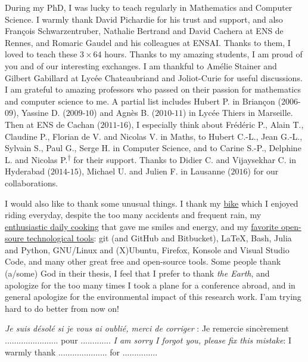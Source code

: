 \begin{acknowledgements}
During my PhD, I was lucky to teach regularly in Mathematics and Computer Science.
I warmly thank David Pichardie for his trust and support, and also François Schwarzentruber, Nathalie Bertrand and David Cachera at ENS de Rennes, and Romaric Gaudel and his colleagues at ENSAI. Thanks to them, I loved to teach these $3 \times 64$ hours.
Thanks to my amazing students, I am proud of you and of our interesting exchanges.
I am thankful to Amélie Stainer and Gilbert Gabillard at Lycée Chateaubriand and Joliot-Curie for useful discussions.
\\
\indent
I am grateful to amazing professors who passed on their passion for mathematics and computer science to me.
A partial list includes Hubert P. in Briançon ($2006$-$09$), Yassine D. ($2009$-$10$) and Agnès B. ($2010$-$11$) in Lycée Thiers in Marseille.
Then at ENS de Cachan ($2011$-$16$), I especially think about Frédéric P., Alain T., Claudine P., Florian de V. and Nicolas V. in Maths, to Hubert C.-L., Jean G.-L., Sylvain S., Paul G., Serge H. in Computer Science, and to Carine S.-P., Delphine L. and Nicolas P.\textsuperscript{$\dagger$} for their support.
Thanks to Didier C. and Vijaysekhar C. in Hyderabad ($2014$-$15$), Michael U. and Julien F. in Lausanne ($2016$) for our collaborations.


I would also like to thank some unusual things.
I thank my \href{https://perso.crans.org/besson/zero-dechet/}{bike} which I enjoyed riding everyday, despite the too many accidents and frequent rain, my \href{https://perso.crans.org/besson/cuisine/}{enthusiastic daily cooking} that gave me smiles and energy, and my \href{https://perso.crans.org/besson/}{favorite open-soure technological tools}: git (and GitHub and Bitbucket), \LaTeX, Bash, Julia and Python, GNU/Linux and (X)Ubuntu, Firefox, Konsole and Visual Studio Code, and many other great free and open-source tools.
Some people thank (a/some) God in their thesis, I feel that I prefer to thank \emph{the Earth}, and apologize for the too many times I took a plane for a conference abroad, and in general apologize for the environmental impact of this research work. I'am trying hard to do better from now on!


\vfill{}

\emph{Je suis désolé si je vous ai oublié, merci de corriger} : Je remercie sincèrement ....................... pour .............
\emph{I am sorry I forgot you, please fix this mistake}: I warmly thank ..................... for ...............


\end{acknowledgements}
